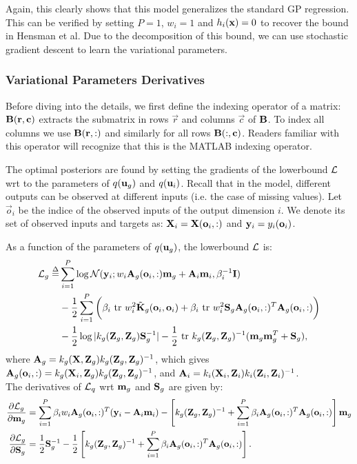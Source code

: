 \documentclass{article} %
\begin{document}
\noindent Again, this clearly shows that this model generalizes the standard GP regression. This can be verified by setting $P = 1$, $w_i = 1$ and $h_i(\x) = 0$ to recover the bound in Hensman et al.
Due to the decomposition of this bound, we can use stochastic gradient descent to learn the variational parameters.

\subsubsection{Variational Parameters Derivatives}
\newcommand{\oi}{\vec{o}_i}
Before diving into the details, we first define the indexing operator of a matrix: $\B(\vec{r},\vec{c})$ extracts the submatrix in rows $\vec{r}$ and columns $\vec{c}$ of $\B$.
To index all columns we use $\B(\vec{r},:)$ and similarly for all rows $\B(:,\vec{c})$.
Readers familiar with this operator will recognize that this is the MATLAB indexing operator.

The optimal posteriors are found by setting the gradients of the lowerbound $\calL$ wrt to the parameters of $q(\ug)$ and $q(\u_i)$.
Recall that in the model, different outputs can be observed at different inputs (i.e. the case of missing values).
Let $\oi$ be the indice of the observed inputs of the output dimension $i$.
We denote its set of observed inputs and targets as: $\X_i = \X(\oi,:)$ and $\y_i = y_{i}(\oi)$.

\noindent As a function of the parameters of $q(\ug)$, the lowerbound $\calL$ is:
\begin{align}
\nonumber
\calL_g \define&
 \sum_{i=1}^P \log \Normal(\y_i; w_i \A_g(\oi,:) \m_g + \A_i \m_i, \beta_i^{-1} \I)  \\
 &- \frac{1}{2} \sum_{i=1}^P \bigg(\beta_i \trace w_i^2 \tilde{\K}_g(\oi,\oi) 
 + \beta_i \trace w_i^2 \S_g \A_g(\oi,:)^T \A_g(\oi,:) \bigg)
 \\
 &- \frac{1}{2} \log |k_g(\Zg,\Zg) \S_g^{-1}| -\frac{1}{2} \trace k_g(\Zg,\Zg)^{-1} (\m_g \m_g^T + \S_g) ,
\end{align}
where $\A_g = k_g(\X,\Z_g)k_g(\Z_g,\Z_g)^{-1}$, which gives $\A_g(\oi,:) = k_g(\X_i,\Zg) k_g(\Z_g,\Z_g)^{-1}$, and  
$\A_i = k_i(\X_i,\Z_i)k_i(\Z_i,\Z_i)^{-1}$. \\

\noindent The derivatives of $\calL_q$ wrt $\m_g$ and $\S_g$ are given by:
\begin{align}
\deriv{\calL_g}{\m_g}
& = \sum_{i=1}^P \beta_i w_i \A_g(\oi,:)^T (\y_i - \A_i \m_i) - \left[k_g(\Zg,\Zg)^{-1} + \sum_{i=1}^P \beta_i \A_g(\oi,:)^T \A_g(\oi,:) \right] \m_g \\
\deriv{\calL_g}{\S_g} 
&= \frac{1}{2} \S_g^{-1} - \frac{1}{2} \left[ k_g(\Zg,\Zg)^{-1} + \sum_{i=1}^P \beta_i \A_g(\oi,:)^T \A_g(\oi,:) \right].
\end{align}
\end{document}
